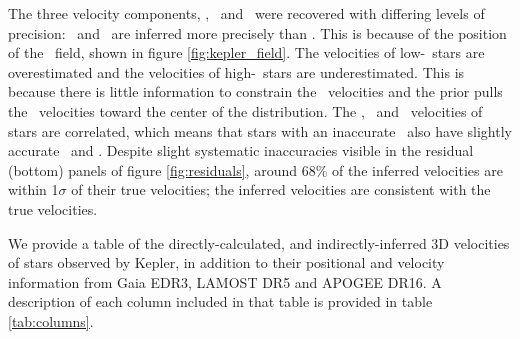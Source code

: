The three velocity components, \vx, \vy\ and \vz\ were recovered with
differing levels of precision: \vx\ and \vz\ are inferred more precisely than
\vy.
This is because of the position of the \kepler\ field, shown in figure
\ref{fig:kepler_field}.
The velocities of low-\vy\ stars are overestimated and the velocities of
high-\vy\ stars are underestimated.
This is because there is little information to constrain the \vy\ velocities
and the prior pulls the \vy\ velocities toward the center of the distribution.
The \vx, \vy\ and \vz\ velocities of stars are correlated, which means that
stars with an inaccurate \vy\ also have slightly accurate \vz\ and \vx.
Despite slight systematic inaccuracies visible in the residual (bottom)
panels of figure \ref{fig:residuals}, around 68\% of the inferred velocities
are within 1$\sigma$ of their true velocities; the inferred velocities are
consistent with the true velocities.

We provide a table of the directly-calculated, and indirectly-inferred 3D
velocities of stars observed by Kepler, in addition to their positional and
velocity information from Gaia EDR3, LAMOST DR5 and APOGEE DR16.
A description of each column included in that table is provided in table
\ref{tab:columns}.

